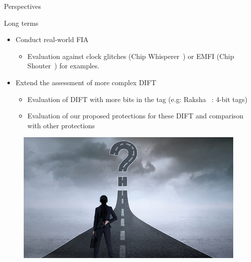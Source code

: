 \begin{frame}{Perspectives}
    \begin{block}{Long terms}
        \begin{itemize}
            [triangle]
            \item Conduct real-world FIA
                \begin{itemize}
                    \item Evaluation against clock glitches (Chip Whisperer~\cite{chipwhisperer}) or EMFI (Chip Shouter~\cite{chipshouter}) for examples.
                \end{itemize}
            \item Extend the assessment of more complex DIFT
                \begin{itemize}
                    \item Evaluation of DIFT with more bits in the tag (e.g: Raksha~\cite{DKK-07-sigarch} : 4-bit tags)
                    \item Evaluation of our proposed protections for these DIFT and comparison with other protections
                \end{itemize}
        \end{itemize}
    \end{block}

    \begin{figure}
        \centering
        \includegraphics[height=.25\textheight]{src/6_conclusion/img/perspectives.jpg}
    \end{figure}
\end{frame}
